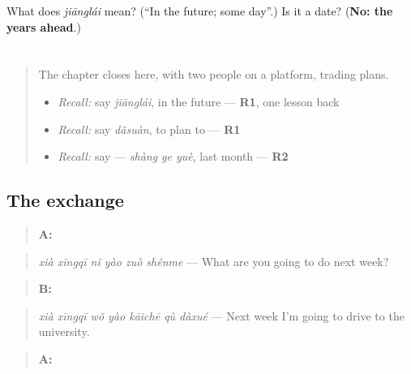 \begin{tcolorbox}[breakable,colback=teal!4,colframe=teal!35!black,title={Before you move on}]
What does \emph{jiānglái} mean? (\textquotedblleft{}In the future; some day\textquotedblright{}.) Is it a date? (\textbf{No: the years ahead}.)
\end{tcolorbox}
\section[Practice]{}

\label{lesson:ZH-C148-practice}



\begin{quote}
The chapter closes here, with two people on a platform, trading plans.

\begin{itemize}
\raggedright
  \item \emph{Recall:} say \emph{jiānglái}, in the future — \textbf{R1}, one lesson back
  \item \emph{Recall:} say \emph{dǎsuàn}, to plan to — \textbf{R1}
  \item \emph{Recall:} say  — \emph{shàng ge yuè}, last month — \textbf{R2}
\end{itemize}
\end{quote}

\subsection*{The exchange}
\begin{quote}
\textbf{A:} 
\end{quote}

\begin{quote}
\emph{xià xīngqī nǐ yào zuò shénme} — What are you going to do next week?
\end{quote}

\begin{quote}
\textbf{B:} 
\end{quote}

\begin{quote}
\emph{xià xīngqī wǒ yào kāichē qù dàxué} — Next week I'm going to drive to the university.
\end{quote}

\begin{quote}
\textbf{A:} 
\end{quote}

